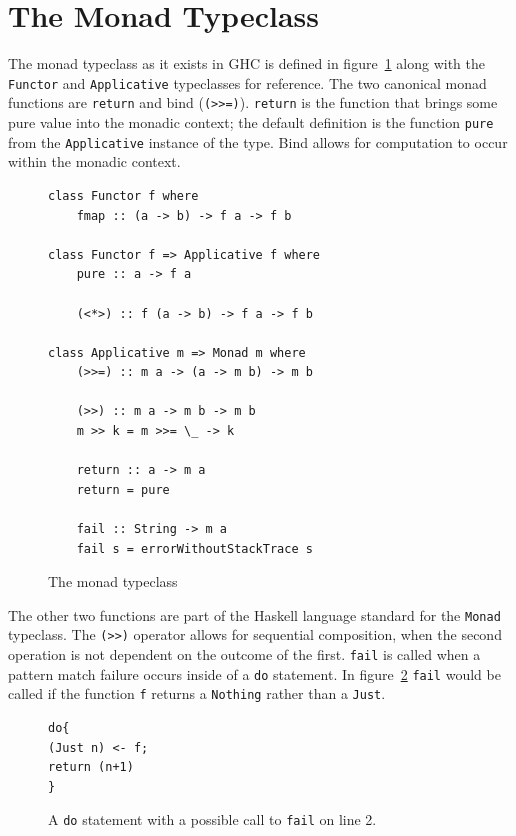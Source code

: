 \section{The Monad Typeclass}
\label{monTC}

The monad typeclass as it exists in GHC is defined in figure~\ref{monadDef} along with the \texttt{Functor} and \texttt{Applicative} typeclasses for reference. The two canonical monad functions are \texttt{return} and bind (\texttt{(>>=)}). \texttt{return} is the function that brings some pure value into the monadic context; the default definition is the function \texttt{pure} from the \texttt{Applicative} instance of the type. Bind allows for computation to occur within the monadic context.

\begin{figure}[t]
\begin{lstlisting}
class Functor f where
	fmap :: (a -> b) -> f a -> f b

class Functor f => Applicative f where
	pure :: a -> f a
	
	(<*>) :: f (a -> b) -> f a -> f b

class Applicative m => Monad m where
	(>>=) :: m a -> (a -> m b) -> m b

	(>>) :: m a -> m b -> m b
	m >> k = m >>= \_ -> k
	
	return :: a -> m a
	return = pure
	
	fail :: String -> m a
	fail s = errorWithoutStackTrace s
\end{lstlisting}
\caption{The monad typeclass}
\label{monadDef}
\end{figure}

The other two functions are part of the Haskell language standard for the \texttt{Monad} typeclass. The \texttt{(>>)} operator allows for sequential composition, when the second operation is not dependent on the outcome of the first. \texttt{fail} is called when a pattern match failure occurs inside of a \texttt{do} statement. In figure~\ref{failCall} \texttt{fail} would be called if the function \texttt{f} returns a \texttt{Nothing} rather than a \texttt{Just}.

\begin{figure}[t]
\begin{lstlisting}
do{
(Just n) <- f;
return (n+1)
}
\end{lstlisting}
\caption{A \texttt{do} statement with a possible call to \texttt{fail} on line 2.}
\label{failCall}
\end{figure}

